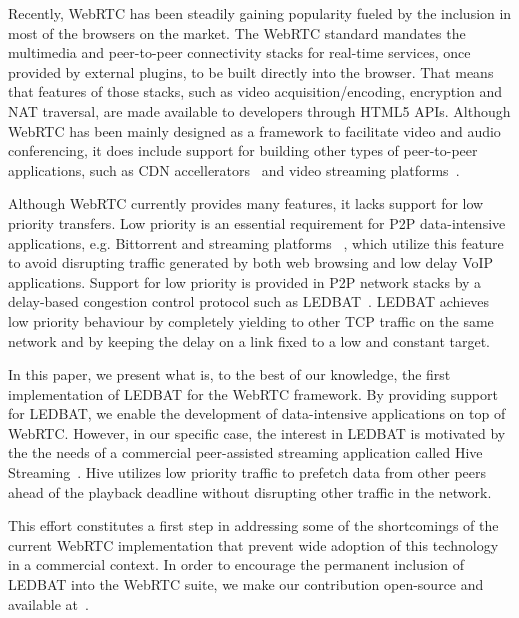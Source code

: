 \documentclass{sig-alternate}
\begin{document}

Recently, WebRTC has been steadily gaining popularity fueled by the inclusion in most of
the browsers on the market. The WebRTC standard mandates the multimedia and peer-to-peer
connectivity stacks for real-time services, once provided by external plugins, to be built
directly into the browser. That means that features of those stacks, such as video
acquisition/encoding, encryption and NAT traversal, are made available to developers
through HTML5 APIs. Although WebRTC has been mainly designed as a framework to facilitate
video and audio conferencing, it does include support for building other types of
peer-to-peer applications, such as CDN accellerators~\cite{peerCDN} and video streaming
platforms~\cite{nurminen2013p2p}. 

Although WebRTC currently provides many features, it lacks support for low priority
transfers. Low priority is an essential requirement for P2P data-intensive applications,
e.g. Bittorrent and streaming platforms ~\cite{smoothcache}, which utilize this feature to
avoid disrupting traffic generated by both web browsing and low delay VoIP applications.
Support for low priority is provided in P2P network stacks by a delay-based congestion
control protocol such as LEDBAT~\cite{ledbat}. LEDBAT achieves low priority behaviour by
completely yielding to other TCP traffic on the same network and by keeping the delay on a
link fixed to a low and constant target.

In this paper, we present what is, to the best of our knowledge, the first implementation
of LEDBAT for the WebRTC framework. By providing support for LEDBAT, we enable the
development of data-intensive applications on top of WebRTC. However, in our specific
case, the interest in LEDBAT is motivated by the the needs of a commercial peer-assisted
streaming application called Hive Streaming~\cite{hive}. Hive utilizes low priority
traffic to prefetch data from other peers ahead of the playback deadline without
disrupting other traffic in the network.

This effort constitutes a first step in addressing some of the shortcomings of the current
WebRTC implementation that prevent wide adoption of this technology in a commercial
context. In order to encourage the permanent inclusion of LEDBAT into the WebRTC suite, we
make our contribution open-source and available at~\cite{webrtc-utp}.
\end{document}
